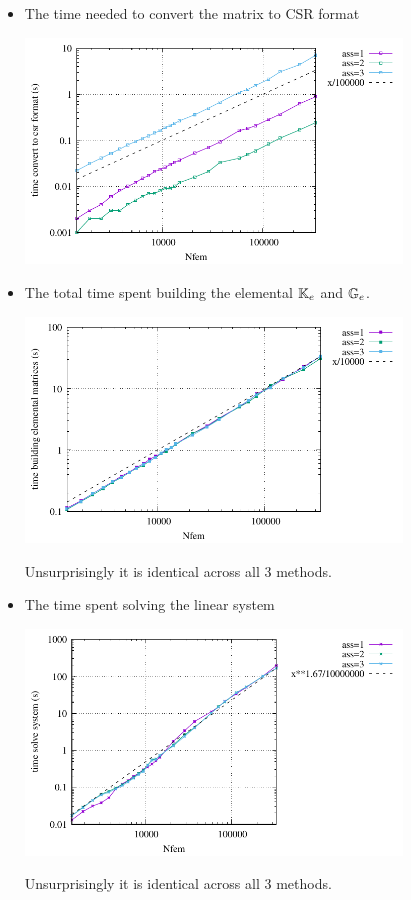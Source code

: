\begin{itemize}
\item The time needed to convert the matrix to CSR format
\begin{center}
\includegraphics[width=10cm]{python_codes/fieldstone_181/RESULTS/times_convert.pdf}
\end{center}

\item The total time spent building the elemental ${\mathbb{K}}_e$ and ${\mathbb{G}}_e$.
\begin{center}
\includegraphics[width=10cm]{python_codes/fieldstone_181/RESULTS/times_matrices.pdf}
\end{center}
Unsurprisingly it is identical across all 3 methods.

\item The time spent solving the linear system
\begin{center}
\includegraphics[width=10cm]{python_codes/fieldstone_181/RESULTS/times_solve.pdf}
\end{center}
Unsurprisingly it is identical across all 3 methods.

\end{itemize}

